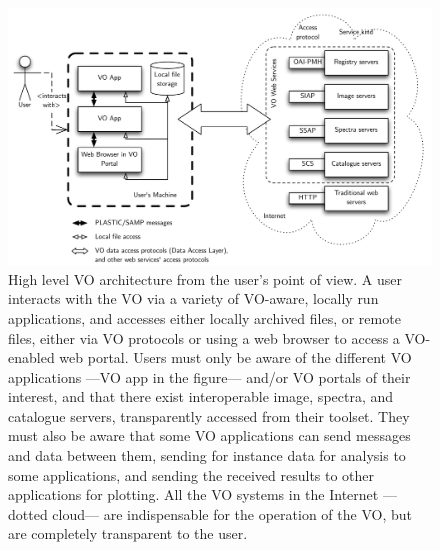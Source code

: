 		\begin{figure}[btp]
			\centering
				\includegraphics[width=\columnwidth]
				{fig/VOArchitectureFromUserPOV.pdf}
			\caption[User view of the VO]
			{
				High level VO architecture from the user's point of
				view. A user interacts with the VO via a variety of
				VO-aware, locally run applications, and accesses
				either locally archived files, or remote files,
				either via VO protocols or using a web browser to
				access a VO-enabled web portal. Users must only be
				aware of the different VO applications
				---VO app in the figure--- and/or VO portals of
				their interest, and that there exist interoperable
				image, spectra, and catalogue servers, transparently
				accessed from their toolset. They must also be
				aware that some VO applications can send messages
				and data between them, sending for instance data
				for analysis to some applications, and sending the
				received results to other applications for
				plotting. All the VO systems in the Internet
				---dotted cloud--- are indispensable for the
				operation of the VO, but are completely transparent
				to the user.
			}
			\label{fig:figUserPOV_VOArch}
		\end{figure}
		
		
